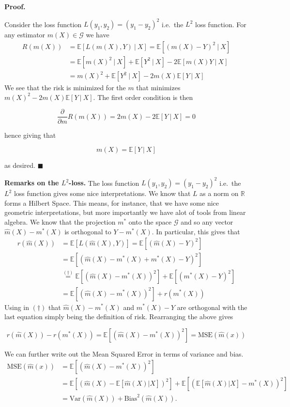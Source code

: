 \documentclass[a4paper,10pt,openany]{book}
\begin{document}
\textbf{Proof.}

Consider the loss function \(L(y_1,y_2)=(y_1-y_2)^2\) i.e.~the \(L^2\) loss function. For any estimator \(m(X)\in \mathcal G\) we have
\begin{align*}
R(m(X))&=\mathbb E[L(m(X),Y)\ \vert\ X]=\mathbb E[(m(X)-Y)^2\ \vert\ X]\\
&=\mathbb E[m(X)^2\ \vert\ X]+\mathbb E[Y^2\ \vert\ X]-2\mathbb E[m(X)Y\ \vert\ X]\\
&=m(X)^2+\mathbb E[Y^2\ \vert\ X]-2m(X)\mathbb E[Y\ \vert\ X]
\end{align*}
We see that the risk is minimized for the \(m\) that minimizes \(m(X)^2-2m(X)\mathbb E[Y\ \vert\ X]\). The first order condition is then

\[
\frac{\partial}{\partial m}R(m(X))=2m(X)-2\mathbb E[Y\ \vert\ X]=0
\]

hence giving that

\[
m(X)=\mathbb E[Y\ \vert\ X]
\]

as desired. \(\blacksquare\)

\textbf{Remarks on the \(L^2\)-loss.} The loss function \(L(y_1,y_2)=(y_1-y_2)^2\) i.e.~the \(L^2\) loss function gives some nice interpretations. We know that \(L\) as a norm on \(\mathbb R\) forms a Hilbert Space. This means, for instance, that we have some nice geometric interpretations, but more importantly we have alot of tools from linear algebra. We know that the projection \(m^*\) onto the space \(\mathcal G\) and so any vector \(\hat m(X)-m^*(X)\) is orthogonal to \(Y-m^*(X)\). In particular, this gives that
\begin{align*}
r(\hat m(X))&=\mathbb E[L(\hat m(X),Y)]=\mathbb E\left[(\hat m(X)-Y)^2\right]\\
&=\mathbb E\left[(\hat m(X)-m^*(X)+m^*(X)-Y)^2\right]\\
&\stackrel{(\dagger)}{=}\mathbb E\left[(\hat m(X)-m^*(X))^2\right]+\mathbb E\left[(m^*(X)-Y)^2\right]\\
&=\mathbb E\left[(\hat m(X)-m^*(X))^2\right]+r(m^*(X))
\end{align*}
Using in \((\dagger)\) that \(\hat m(X)-m^*(X)\) and \(m^*(X)-Y\) are orthogonal with the last equation simply being the definition of risk. Rearranging the above gives

\[
r(\hat m(X))-r(m^*(X))=\mathbb E\left[(\hat m(X)-m^*(X))^2\right]=\text{MSE}(\hat m(x))
\]

We can further write out the Mean Squared Error in terms of variance and bias.
\begin{align*}
\text{MSE}(\hat m(x))&=\mathbb E\left[(\hat m(X)-m^*(X))^2\right]\\
&=\mathbb E\left[(\hat m(X)-\mathbb E[\hat m(X)\vert X])^2\right]+\mathbb E\left[(\mathbb E[\hat m(X)\vert X]-m^*(X))^2\right]\\
&=\text{Var}(\hat m(X))+\text{Bias}^2(\hat m(X)).
\end{align*}
\end{document}
